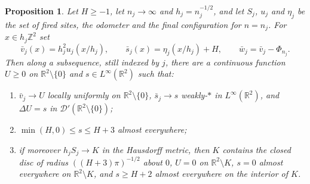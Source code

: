 \documentclass[11pt]{amsart}
\newtheorem{proposition}[theorem]{Proposition}
\theoremstyle{remark}
\numberwithin{equation}{section}
\newcommand{\Z}{\mathbb Z}
\newcommand{\R}{\mathbb R}
\newcommand{\D}{\mathcal D}
\begin{document}
\begin{proposition}\label{prop:limit}
Let $H\ge-1$, let $n_j\to\infty$ and $h_j=n_j^{-1/2}$, and let $S_j$, $u_j$ and $\eta_j$ be the set of fired sites, the odometer and the final configuration for $n=n_j$. For $x\in h_j\Z^2$ set
\[
\bar v_j(x)=h_j^2u_j(x/h_j),\qquad\bar s_j(x)=\eta_j(x/h_j)+H,\qquad\bar w_j=\bar v_j-\Phi_{n_j}.
\]
Then along a subsequence, still indexed by $j$, there are a continuous function $U\ge0$ on $\R^2\setminus\{0\}$ and $s\in L^\infty(\R^2)$ such that:
\begin{enumerate}[label=\textup{(\roman*)}]
\item $\bar v_j\to U$ locally uniformly on $\R^2\setminus\{0\}$, $\bar s_j\to s$ weakly-$*$ in $L^\infty(\R^2)$, and $\Delta U=s$ in $\D'(\R^2\setminus\{0\})$;
\item $\min(H,0)\le s\le H+3$ almost everywhere;
\item if moreover $h_jS_j\to K$ in the Hausdorff metric, then $K$ contains the closed disc of radius $((H+3)\pi)^{-1/2}$ about $0$, $U=0$ on $\R^2\setminus K$, $s=0$ almost everywhere on $\R^2\setminus K$, and $s\ge H+2$ almost everywhere on the interior of $K$.
\end{enumerate}
\end{proposition}
\end{document}
